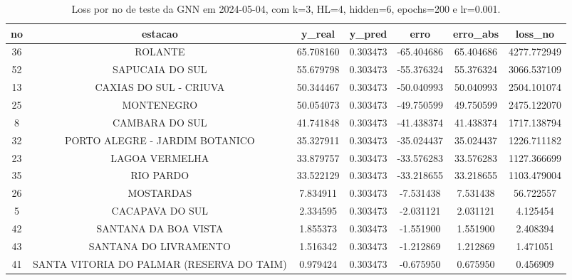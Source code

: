\begin{table}[h]
\centering
\caption{Loss por no de teste da GNN em 2024-05-04, com k=3, HL=4, hidden=6, epochs=200 e lr=0.001.}
\label{tab:gnn_loss_k3_hl4_h6_e200_d20240504}
\begin{tabular}{ccccccc}
\toprule
no & estacao & y\_real & y\_pred & erro & erro\_abs & loss\_no \\
\midrule
36 & ROLANTE & 65.708160 & 0.303473 & -65.404686 & 65.404686 & 4277.772949 \\
52 & SAPUCAIA DO SUL & 55.679798 & 0.303473 & -55.376324 & 55.376324 & 3066.537109 \\
13 & CAXIAS DO SUL - CRIUVA & 50.344467 & 0.303473 & -50.040993 & 50.040993 & 2504.101074 \\
25 & MONTENEGRO & 50.054073 & 0.303473 & -49.750599 & 49.750599 & 2475.122070 \\
8 & CAMBARA DO SUL & 41.741848 & 0.303473 & -41.438374 & 41.438374 & 1717.138794 \\
32 & PORTO ALEGRE - JARDIM BOTANICO & 35.327911 & 0.303473 & -35.024437 & 35.024437 & 1226.711182 \\
23 & LAGOA VERMELHA & 33.879757 & 0.303473 & -33.576283 & 33.576283 & 1127.366699 \\
35 & RIO PARDO & 33.522129 & 0.303473 & -33.218655 & 33.218655 & 1103.479004 \\
26 & MOSTARDAS & 7.834911 & 0.303473 & -7.531438 & 7.531438 & 56.722557 \\
5 & CACAPAVA DO SUL & 2.334595 & 0.303473 & -2.031121 & 2.031121 & 4.125454 \\
42 & SANTANA DA BOA VISTA & 1.855373 & 0.303473 & -1.551900 & 1.551900 & 2.408394 \\
43 & SANTANA DO LIVRAMENTO & 1.516342 & 0.303473 & -1.212869 & 1.212869 & 1.471051 \\
41 & SANTA VITORIA DO PALMAR (RESERVA DO TAIM) & 0.979424 & 0.303473 & -0.675950 & 0.675950 & 0.456909 \\
\bottomrule
\end{tabular}
\end{table}
